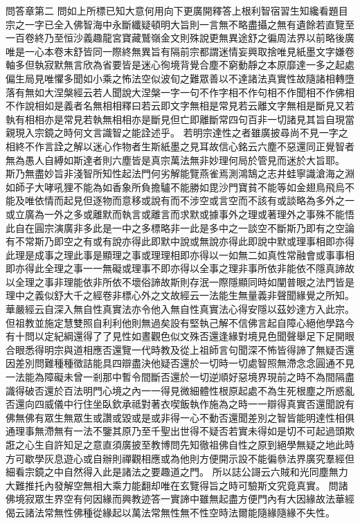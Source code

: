 問答章第二
問如上所標已知大意何用向下更廣開釋答上根利智宿習生知纔看題目宗之一字已全入佛智海中永斷纖疑頓明大旨則一言無不略盡攝之無有遺餘若直覽至一百卷終乃至恒沙義趣龍宮寶藏鷲嶺金文則殊說更無異途舒之徧周法界以前略後廣唯是一心本卷末舒皆同一際終無異旨有隔前宗都謂迷情妄興取捨唯見紙墨文字嫌卷軸多但執寂默無言欣為省要皆是迷心徇境背覺合塵不窮動靜之本原靡達一多之起處偏生局見唯懼多聞如小乘之怖法空似波旬之難眾善以不達諸法真實性故隨諸相轉墮落有無如大涅槃經云若人聞說大涅槃一字一句不作字相不作句相不作聞相不作佛相不作說相如是義者名無相相釋曰若云即文字無相是常見若云離文字無相是斷見又若執有相相亦是常見若執無相相亦是斷見但亡即離斷常四句百非一切諸見其旨自現當親現入宗鏡之時何文言識智之能詮述乎。
若明宗達性之者雖廣披尋尚不見一字之相終不作言詮之解以迷心作物者生斯紙墨之見耳故信心銘云六塵不惡還同正覺智者無為愚人自縛如斯達者則六塵皆是真宗萬法無非妙理何局於管見而迷於大旨耶。
斯乃無盡妙旨非淺智所知性起法門何劣解能覽燕雀焉測鴻鵠之志井蛙寧識滄海之淵如師子大哮吼狸不能為如香象所負擔驢不能勝如毘沙門寶貧不能等如金翅鳥飛烏不能及唯依情而起見但逐物而意移或說有而不涉空或言空而不該有或談略為多外之一或立廣為一外之多或離默而執言或離言而求默或據事外之理或著理外之事殊不能悟此自在圓宗演廣非多此是一中之多標略非一此是多中之一談空不斷斯乃即有之空論有不常斯乃即空之有或有說亦得此即默中說或無說亦得此即說中默或理事相即亦得此理是成事之理此事是顯理之事或理理相即亦得以一如無二如真性常融會或事事相即亦得此全理之事一一無礙或理事不即亦得以全事之理非事所依非能依不隱真諦故以全理之事非理能依非所依不壞俗諦故斯則存泯一際隱顯同時如闡普眼之法門皆是理中之義似舒大千之經卷非標心外之文故經云一法能生無量義非聲聞緣覺之所知。
華嚴經云自深入無自性真實法亦令他入無自性真實法心得安隱以茲妙達方入此宗。
但祖教並施定慧雙照自利利他則無過矣設有堅執己解不信佛言起自障心絕他學路今有十問以定紀綱還得了了見性如晝觀色似文殊否還逢緣對境見色聞聲舉足下足開眼合眼悉得明宗與道相應否還覽一代時教及從上祖師言句聞深不怖皆得諦了無疑否還因差別問難種種徵詰能具四辯盡決他疑否還於一切時一切處智照無滯念念圓通不見一法能為障礙未曾一剎那中暫令間斷否還於一切逆順好惡境界現前之時不為間隔盡識得破否還於百法明門心境之內一一得見微細體性根原起處不為生死根塵之所惑亂否還向四威儀中行住坐臥欽承祗對著衣喫飯執作施為之時一一辯得真實否還聞說有佛無佛有眾生無眾生或讚或毀或是或非得一心不動否還聞差別之智皆能明達性相俱通理事無滯無有一法不鑒其原乃至千聖出世得不疑否若實未得如是切不可起過頭欺誑之心生自許知足之意直須廣披至教博問先知徹祖佛自性之原到絕學無疑之地此時方可歇學灰息遊心或自辦則禪觀相應或為他則方便開示設不能徧叅法界廣究羣經但細看宗鏡之中自然得入此是諸法之要趣道之門。
所以誌公謌云六賊和光同塵無力大難推托內發解空無相大乘力能翻却唯在玄覽得旨之時可驗斯文究竟真實。
問諸佛境寂眾生界空有何因緣而興教迹答一實諦中雖無起盡方便門內有大因緣故法華經偈云諸法常無性佛種從緣起以萬法常無性無不性空時法爾能隨緣隨緣不失性。
